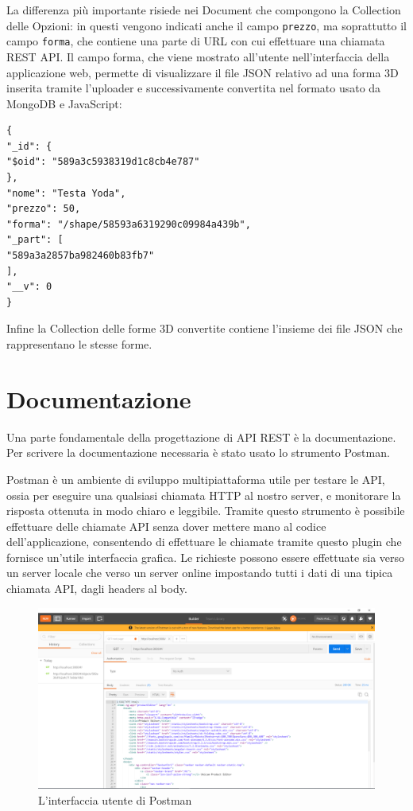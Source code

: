 La differenza più importante risiede nei Document che compongono la Collection delle Opzioni: in questi vengono indicati anche il campo \texttt{prezzo}, ma soprattutto il campo \texttt{forma}, che contiene una parte di URL con cui effettuare una chiamata REST API. Il campo forma, che viene mostrato all'utente nell'interfaccia della applicazione web, permette di visualizzare il file JSON relativo ad una forma 3D inserita tramite l'uploader e successivamente convertita nel formato usato da MongoDB e JavaScript:
\begin{lstlisting}[caption={Option Collection}, style=javaScriptCode]
{
"_id": {
"$oid": "589a3c5938319d1c8cb4e787"
},
"nome": "Testa Yoda",
"prezzo": 50,
"forma": "/shape/58593a6319290c09984a439b",
"_part": [
"589a3a2857ba982460b83fb7"
],
"__v": 0
}
\end{lstlisting}

Infine la Collection delle forme 3D convertite contiene l'insieme dei file JSON che rappresentano le stesse forme.

\section{Documentazione}
Una parte fondamentale della progettazione di API REST è la documentazione.
Per scrivere la documentazione necessaria è stato usato lo strumento Postman.

Postman\cite{postman} è un ambiente di sviluppo multipiattaforma utile per testare le API, ossia per eseguire una qualsiasi chiamata HTTP al nostro server, e monitorare la risposta ottenuta in modo chiaro e leggibile. 
Tramite questo strumento è possibile effettuare delle chiamate API senza dover mettere mano al codice dell’applicazione, consentendo di effettuare le chiamate tramite questo plugin che fornisce un’utile interfaccia grafica. Le richieste possono essere effettuate sia verso un server locale che verso un server online impostando tutti i dati di una tipica chiamata API, dagli headers al body.
\begin{figure}[h]
	\centering
	\includegraphics[scale=0.35]{Immagini/postman_ui.png}
	\caption{L'interfaccia utente di Postman}
\end{figure}

